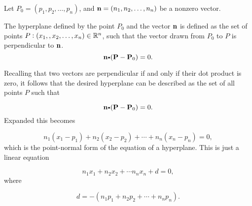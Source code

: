 Let  $P_0 = (p_1, p_2, \dots, p_n)$, and  $\mathbf{ n} = (n_1, n_2,\dots ,n_n)$
be a nonzero vector. 

\begin{df}
The hyperplane defined by the point $P_0$ and the vector $\mathbf{ n}$ is defined as the set of points 
$P:(x_1, , x_2,\dots ,x_n)\in \mathbb{R}^n$,  
such that the vector drawn from $P_0$ to $P$ is perpendicular to  $\mathbf{ n}$.
\[\displaystyle \vector{n} \bp (\vector{P} -\vector{P} _{0})=0.\]
\end{df}


Recalling that two vectors are perpendicular if and only if their dot product is
zero, it follows that the desired hyperplane can be described as the set of all points $P$ such that

\[\displaystyle \vector{n} \bp (\vector{P} -\vector{P} _{0})=0.\]
 Expanded this becomes

\[\displaystyle n_1(x_1-p_1)+n_2(x_2-p_2)+\cdots+n_n(x_n-p_n)=0,\] 
which is the point-normal form of the equation of a hyperplane. This is just a linear equation

\[\displaystyle n_1x_1+n_2x_2+\cdots n_nx_n+d=0,\] 
where

\[\displaystyle d=-(n_1p_1+n_2p_2+\cdots + n_np_{n}).\]
% 
% 


